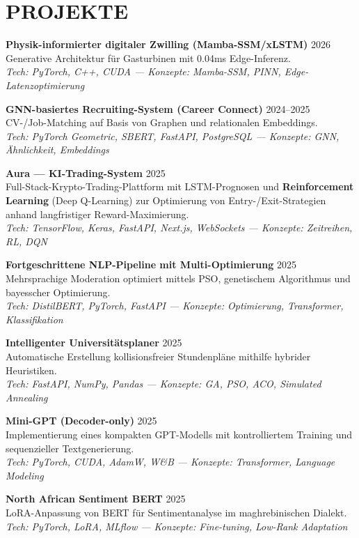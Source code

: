 \documentclass[a4paper,12pt]{article}
\begin{document}
\section{PROJEKTE}
\setlength{\parskip}{11pt}
{\small

\textbf{Physik-informierter digitaler Zwilling (Mamba-SSM/xLSTM)} \hfill 2026 \\
Generative Architektur für Gasturbinen mit 0.04ms Edge-Inferenz. \\
\textit{Tech: PyTorch, C++, CUDA — Konzepte: Mamba-SSM, PINN, Edge-Latenzoptimierung}

\textbf{GNN-basiertes Recruiting-System (Career Connect)} \hfill 2024--2025 \\
CV-/Job-Matching auf Basis von Graphen und relationalen Embeddings. \\
\textit{Tech: PyTorch Geometric, SBERT, FastAPI, PostgreSQL — Konzepte: GNN, Ähnlichkeit, Embeddings}

\textbf{Aura — KI-Trading-System} \hfill 2025 \\
Full-Stack-Krypto-Trading-Plattform mit LSTM-Prognosen und \textbf{Reinforcement Learning} (Deep Q-Learning) zur Optimierung von Entry-/Exit-Strategien anhand langfristiger Reward-Maximierung. \\
\textit{Tech: TensorFlow, Keras, FastAPI, Next.js, WebSockets — Konzepte: Zeitreihen, RL, DQN}

\textbf{Fortgeschrittene NLP-Pipeline mit Multi-Optimierung} \hfill 2025 \\
Mehrsprachige Moderation optimiert mittels PSO, genetischem Algorithmus und bayesscher Optimierung. \\
\textit{Tech: DistilBERT, PyTorch, FastAPI — Konzepte: Optimierung, Transformer, Klassifikation}

\textbf{Intelligenter Universitätsplaner} \hfill 2025 \\
Automatische Erstellung kollisionsfreier Stundenpläne mithilfe hybrider Heuristiken. \\
\textit{Tech: FastAPI, NumPy, Pandas — Konzepte: GA, PSO, ACO, Simulated Annealing}

\textbf{Mini-GPT (Decoder-only)} \hfill 2025 \\
Implementierung eines kompakten GPT-Modells mit kontrolliertem Training und sequenzieller Textgenerierung. \\
\textit{Tech: PyTorch, CUDA, AdamW, W\&B — Konzepte: Transformer, Language Modeling}

\textbf{North African Sentiment BERT} \hfill 2025 \\
LoRA-Anpassung von BERT für Sentimentanalyse im maghrebinischen Dialekt. \\
\textit{Tech: PyTorch, LoRA, MLflow — Konzepte: Fine-tuning, Low-Rank Adaptation}

}
\end{document}
